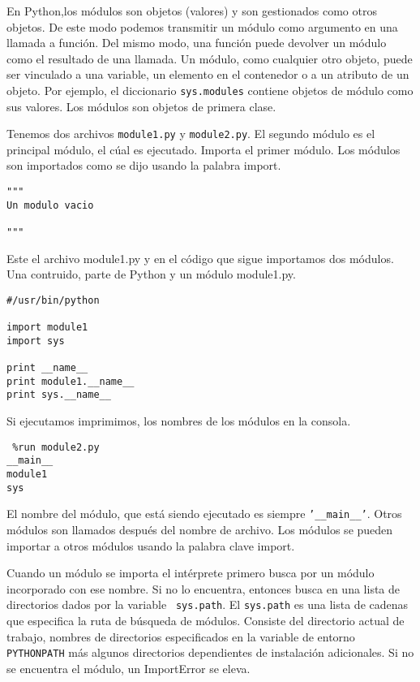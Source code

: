 \documentclass[twoside,10.5pt]{article}%
\begin{document}
En Python,los  m\'odulos son objetos (valores) y son gestionados como otros objetos. De este modo podemos transmitir un m\'odulo como argumento en una llamada a funci\'on. Del mismo modo, una funci\'on puede devolver un m\'odulo como el resultado de una llamada. Un m\'odulo, como cualquier otro objeto, puede ser vinculado a una variable, un elemento en el contenedor o a un atributo de un objeto. Por ejemplo, el diccionario \texttt{sys.modules} contiene objetos de m\'odulo como sus valores. Los m\'odulos son objetos de primera clase.

Tenemos dos archivos \texttt{module1.py} y \texttt{module2.py}. El segundo m\'odulo es el principal m\'odulo, el c\'ual es ejecutado. Importa el primer m\'odulo. Los m\'odulos son importados como se dijo usando la palabra  {\color{red} import}.

\vspace{0.3cm}

\begin{verbatim}
"""
Un modulo vacio

"""
\end{verbatim}

Este el archivo module1.py y en el c\'odigo que sigue importamos dos m\'odulos. Una contruido, parte de Python y un m\'odulo module1.py.


\begin{verbatim}
#/usr/bin/python 

import module1
import sys

print __name__
print module1.__name__
print sys.__name__
\end{verbatim}

Si ejecutamos imprimimos, los nombres de los m\'odulos en la consola.

\vspace{0.3cm}

\begin{verbatim}
 %run module2.py
__main__
module1
sys
\end{verbatim}

El nombre del m\'odulo, que est\'a siendo ejecutado es siempre \texttt{'\_\_main\_\_'}. Otros m\'odulos son llamados  despu\'es del nombre de archivo. Los m\'odulos se pueden importar a otros m\'odulos usando la palabra clave {\color{red} import}.

Cuando un m\'odulo se importa el int\'erprete primero busca por un m\'odulo incorporado con ese nombre. Si no lo encuentra, entonces busca en una lista de directorios dados por la variable \texttt{ sys.path}. El \texttt{sys.path} es una lista de cadenas que especifica la ruta de b\'usqueda de m\'odulos. Consiste del directorio actual de trabajo, nombres de directorios especificados en la variable de entorno \texttt{PYTHONPATH} m\'as algunos directorios dependientes de instalaci\'on adicionales. Si no se encuentra el m\'odulo, un {\color{blue} ImportError} se eleva. 
\end{document}
